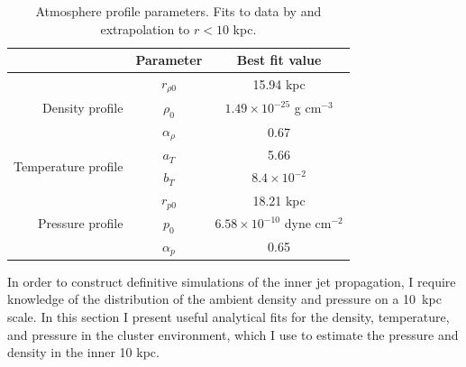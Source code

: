 \begin{table}
\caption{Atmosphere profile parameters. Fits to data by \citet{david01} and extrapolation to $r<10$ kpc.} 
\centering
\begin{tabular}{r c c}
 \hline\hline
 & Parameter & Best fit value \\
 \hline
 \multirow{3}{*}{Density profile} & $r_{\rho 0}$ &  15.94 kpc \\
 & $\rho_0$     &  $1.49\times 10^{-25}$ g cm$^{-3}$ \\
 & $\alpha_{\rho}$ & 0.67  \\  
 \hline
 \multirow{2}{*}{Temperature profile} & $a_T$   & 5.66     \\
 & $b_T$   & $8.4\times10^{-2}$ \\
 \hline
 \multirow{3}{*}{Pressure profile} & $r_{p0}$  & 18.21 kpc	 \\
 & $p_0$     &	$6.58 \times 10^{-10}$ dyne cm$^{-2}$ \\
 & $\alpha_{p}$ & 0.65  \\
 \hline
\end{tabular}
\label{halo parameters}
\end{table}


In order to construct definitive simulations of the inner jet propagation, I require knowledge of the distribution of the ambient density and pressure on a 10~kpc scale. In this section I present useful analytical fits for the density, temperature, and pressure in the cluster environment, which I use to estimate the pressure and density in the inner 10 kpc.

